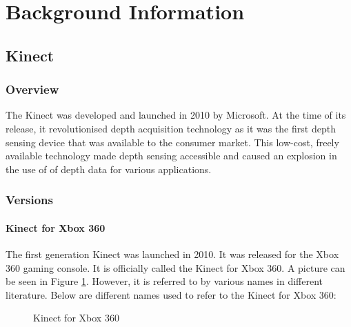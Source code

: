\section{Background Information}


\subsection{Kinect}

\subsubsection{Overview}
The Kinect was developed and launched in 2010 by Microsoft. At the time of its release, it revolutionised depth acquisition technology as it was the first depth sensing device that was available to the consumer market. This low-cost, freely available technology made depth sensing accessible and caused an explosion in the use of of depth data for various applications. \cite{kinectComp2011}

\subsubsection{Versions}

\paragraph{Kinect for Xbox 360}
The first generation Kinect was launched in 2010. It was released for the Xbox 360 gaming console. It is officially called the Kinect for Xbox 360. \cite{kinectComp2011} A picture can be seen in Figure \ref{fig:kinect360}. However, it is referred to by various names in different literature. Below are different names used to refer to the Kinect for Xbox 360:

\begin{figure}[ht]
	\centering
	{%
		\setlength{\fboxsep}{0pt}%
		\setlength{\fboxrule}{0.5pt}%
		}
	\caption{Kinect for Xbox 360 \cite{kinectComp2011}}
	\label{fig:kinect360}
\end{figure}

